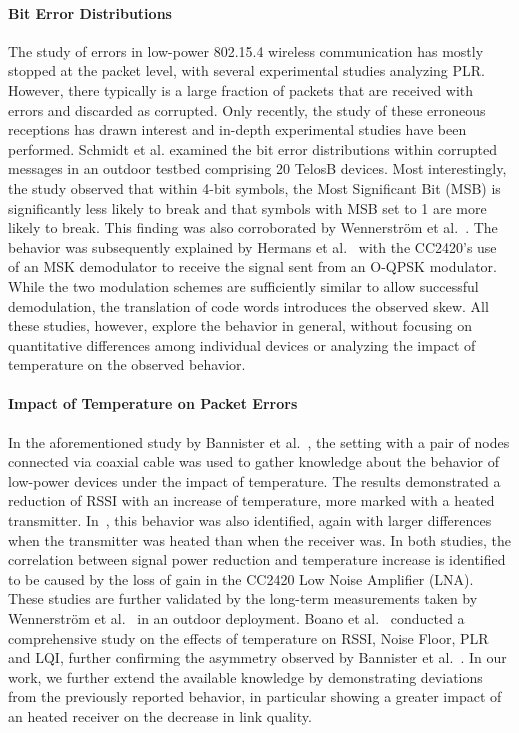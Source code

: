 \documentclass[color]{aib}
\begin{document}
\paragraph{Bit Error Distributions}
The study of errors in low-power 802.15.4 wireless communication has mostly stopped at the packet level, with several experimental studies analyzing PLR.
However, there typically is a large fraction of packets that are received with errors and discarded as corrupted.
Only recently, the study of these erroneous receptions has drawn interest and in-depth experimental studies have been performed.
Schmidt et al.\cite{senserr} examined the bit error distributions within corrupted messages in an outdoor testbed comprising 20 TelosB devices.
Most interestingly, the study observed that within 4-bit symbols, the Most Significant Bit (MSB) is significantly less likely to break and that symbols with MSB set to 1 are more likely to break.
This finding was also corroborated by Wennerström et al.~\cite{wennerstrom13extreme}.
The behavior was subsequently explained by Hermans et al.~\cite{hermans14ewsn} with the CC2420's use of an MSK demodulator to receive the signal sent from an O-QPSK modulator.
While the two modulation schemes are sufficiently similar to allow successful demodulation, the translation of code words introduces the observed skew.
All these studies, however, explore the behavior in general, without focusing on quantitative differences among individual devices or analyzing the impact of temperature on the observed behavior.

\paragraph{Impact of Temperature on Packet Errors}
In the aforementioned study by Bannister et al.~\cite{bannister08hot}, the setting with a pair of nodes connected via coaxial cable was used to gather knowledge about the behavior of low-power devices under the impact of temperature.
The results demonstrated a reduction of RSSI with an increase of temperature, more marked with a heated transmitter.
In~\cite{boano10transaction}, this behavior was also identified, again with larger differences when the transmitter was heated than when the receiver was.
In both studies, the correlation between signal power reduction and temperature increase is identified to be caused by the loss of gain in the CC2420 Low Noise Amplifier (LNA).
These studies are further validated by the long-term measurements taken by Wennerström et al.~\cite{wennerstrom13secon} in an outdoor deployment.
Boano et al.~\cite{boano13extreme} conducted a comprehensive study on the effects of temperature on RSSI, Noise Floor, PLR and LQI, further confirming the asymmetry observed by Bannister et al.~\cite{bannister08hot}.
In our work, we further extend the available knowledge by demonstrating deviations from the previously reported behavior, in particular showing a greater impact of an heated receiver on the decrease in link quality.
\end{document}
